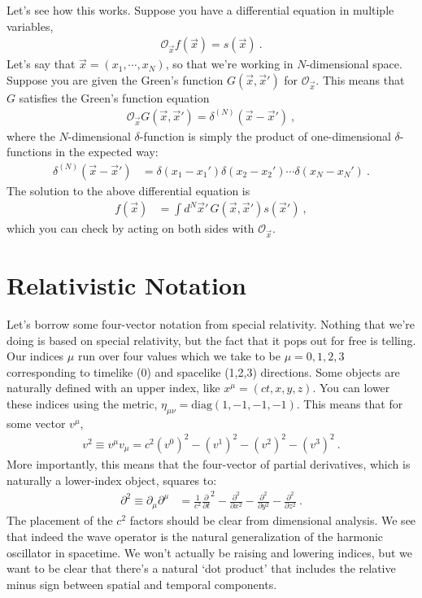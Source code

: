 \documentclass[
  11pt,
	colorful,
	raggedright,
]{tufte-style-thesis-flip}
\begin{document}
Let's see how this works. Suppose you have a differential equation in multiple variables,
\begin{align}
  \mathcal O_{\vec{x}} f(\vec{x}) = s(\vec{x}) \ .
\end{align}
Let's say that $\vec{x}=(x_1, \cdots, x_N)$, so that we're working in $N$-dimensional space. Suppose you are given the Green's function $G(\vec{x},\vec{x}')$ for $\mathcal O_{\vec{x}}$. This means that $G$ satisfies the Green's function equation
\begin{align}
  \mathcal O_{\vec{x}} G(\vec{x},\vec{x}') = \delta^{(N)}(\vec{x}-\vec{x}') \ ,
\end{align}
where the $N$-dimensional $\delta$-function is simply the product of one-dimensional $\delta$-functions in the expected way:
\begin{align}
  \delta^{(N)}(\vec{x}-\vec{x}') 
  &=
  \delta(x_1-x_1')\delta(x_2-x_2')\cdots\delta(x_N-x_N') \ .
\end{align}
The solution to the above differential equation is
\begin{align}
  f(\vec{x}) &= \int d^N\vec{x}'\,  G(\vec{x},\vec{x}') s(\vec{x}') \ ,
\end{align}
which you can check by acting on both sides with $\mathcal O_{\vec{x}}$.




\section{Relativistic Notation}

Let's borrow some four-vector notation from special relativity. Nothing that we're doing is based on special relativity, but the fact that it pops out for free is telling. Our indices $\mu$ run over four values which we take to be $\mu = 0,1,2,3$ corresponding to timelike (0) and spacelike (1,2,3) directions. Some objects are naturally defined with an upper index, like $x^\mu = (ct,x,y,z)$. You can lower these indices using the metric, $\eta_{\mu\nu}=\text{diag}(1,-1,-1,-1)$. This means that for some vector $v^\mu$,
\begin{align}
  v^2 \equiv v^\mu v_\mu 
  = c^2(v^0)^2 - (v^1)^2 - (v^2)^2 - (v^3)^2 \ .
 \end{align}
 More importantly, this means that the four-vector of partial derivatives, which is naturally a lower-index object, squares to:
 \begin{align}
   \partial^2\equiv
  \partial_\mu \partial^\mu 
  &= 
  \frac{1}{c^2}
      \frac{\partial}{\partial t}^2
      -
      \frac{\partial^2}
      {\partial x^2}
      -
      \frac{\partial^2}
      {\partial y^2}
      -
      \frac{\partial^2}
      {\partial z^2} \ .
 \end{align}
The placement of the $c^2$ factors should be clear from dimensional analysis. We see that indeed the wave operator is the natural generalization of the harmonic oscillator in spacetime. We won't actually be raising and lowering indices, but we want to be clear that there's a natural `dot product' that includes the relative minus sign between spatial and temporal components.
\end{document}
